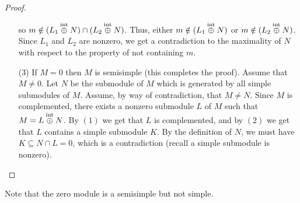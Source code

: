 \documentclass[11pt,a4paper]{article}
\begin{document}
\begin{proof}
\begin{enumerate}
\[      \]
      so $m \notin (L_1 \ioplus N) \cap (L_2 \ioplus N)$.
      Thus, either $m \notin (L_1 \ioplus N)$
      or $m \notin (L_2 \ioplus N)$.
      Since $L_1$ and $L_2$ are nonzero, we get a contradiction to the maximality
      of $N$ with respect to the property of not containing $m$.
    \item[(3)] If $M = 0$ then $M$ is semisimple (this completes the proof).
      Assume that $M \neq 0$.
      Let $N$ be the submodule of $M$ which is generated by all simple
      submodules of $M$.
      Assume, by way of contradiction, that $M \neq N$.
      Since $M$ is complemented, there exists a nonzero submodule $L$
      of $M$ such that $M = L \overset{\text{int}}{\oplus} N$.
      By $(1)$ we get that $L$ is complemented,
      and by $(2)$ we get that $L$ contains a simple submodule $K$.
      By the definition of $N$, we must have $K \subseteq N \cap L = 0$,
      which is a contradiction (recall a simple submodule is nonzero).
  \end{enumerate}
\end{proof}

\begin{remark}
  Note that the zero module is a semisimple but not simple.
\end{remark}
\end{document}
